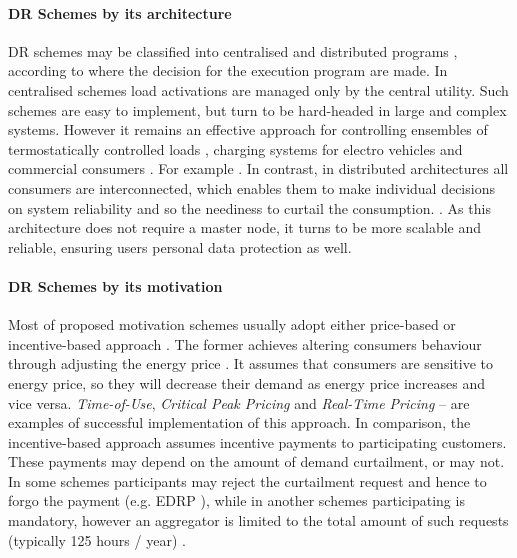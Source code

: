 \paragraph{DR Schemes by its architecture} DR schemes may be classified into centralised and distributed programs \cite{Zhou2012}, according to where the decision for the execution program are made. In centralised schemes load activations are managed only by the central utility. Such schemes are easy to implement, but turn to be hard-headed in large and complex systems. However it remains an effective approach for controlling ensembles of termostatically controlled loads \cite{Hao2015}, charging systems for electro vehicles \cite{Yano2012} and commercial consumers \cite{Motegi2007}. For example . In contrast, in distributed architectures all consumers are interconnected, which enables them to make individual decisions on system reliability and so the neediness to curtail the consumption. \cite{Fan2011}. As this architecture does not require a master node, it turns to be more scalable and reliable, ensuring users personal data protection as well. 

\paragraph{DR Schemes by its motivation}
Most of proposed motivation schemes usually adopt either price-based or incentive-based approach \cite{Vardakas2015}. The former achieves altering consumers behaviour through adjusting the energy price \cite{Aghaei2013}. It assumes that consumers are sensitive to energy price, so they will decrease their demand as energy price increases and vice versa. \textit{Time-of-Use}\cite{Aghaei2013},  \textit{Critical Peak Pricing}\cite{Zhou2012} and \textit{Real-Time Pricing} \cite{Chen2011} -- are examples of successful implementation of this approach. In comparison, the incentive-based approach assumes incentive payments to participating customers. These payments may depend on the amount of demand curtailment, or may not. In some schemes participants may reject the curtailment request and hence to forgo the payment (e.g. EDRP \cite{Aalami2010}), while in another schemes participating is mandatory, however an aggregator is limited to the total amount of such requests (typically 125 hours / year) \cite{Chen2013}. 



